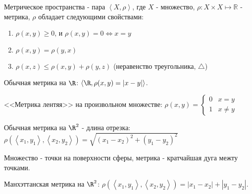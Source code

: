 \begin{definition} \thmslashn 

    Метрическое пространства - пара $\left<X, \rho\right>$, где $X$ - множество, $\rho : X \times X \mapsto \mathbb{R}$ - метрика, $\rho$ обладает следующими свойствами:

    \begin{enumerate}
        \item $\rho(x, y) \ge 0$, и $\rho(x, y) = 0 \iff x = y$
        \item $\rho(x, y) = \rho(y, x)$
        \item $\rho(x, z) \le \rho(x, y) + \rho(y, z)$ (неравенство треугольника, $\triangle$)
    \end{enumerate}
\end{definition}
\begin{example} \thmslashn

    Обычная метрика на $\R$: $\left<\R, \rho(x, y) = |x-y|\right>$.
\end{example}
\begin{example} \thmslashn

    <<Метрика лентяя>> на произвольном множестве: 
    $\rho(x,y) = \begin{cases} 0 & x = y\\ 1 & x \neq y \end{cases}$ 
\end{example}
\begin{example} \thmslashn

    Обычная метрика на $\R^2$ - длина отрезка: $\rho(\left<x_1, y_1\right>, \left<x_2, y_2\right>) = \sqrt{(x_1-x_2)^2+(y_1-y_2)^2} $
\end{example}
\begin{example} \thmslashn

    Множество - точки на поверхности сферы, метрика - кратчайшая дуга межту точками.
\end{example}
\begin{example} \thmslashn

    Манхэттанская метрика на $\R^2$: $\rho(\left<x_1, y_1\right>, \left<x_2, y_2\right>) = |x_1-x_2|+|y_1-y_2|$.
\end{example}

